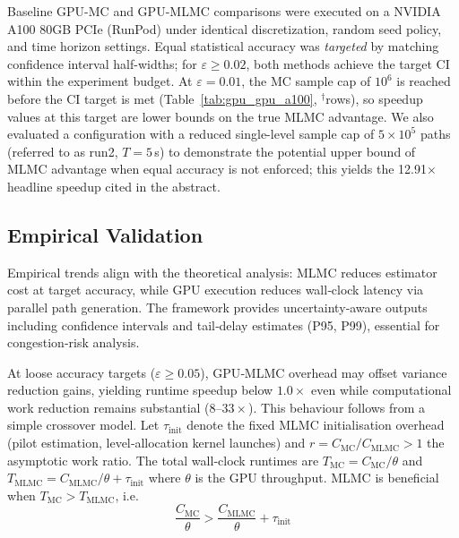 \documentclass{ieeeaccess}
\begin{document}
Baseline GPU-MC and GPU-MLMC comparisons were executed on a NVIDIA A100 80GB PCIe (RunPod)
under identical discretization, random seed policy, and time horizon settings. Equal statistical
accuracy was \emph{targeted} by matching confidence interval half-widths; for $\varepsilon \geq
0.02$, both methods achieve the target CI within the experiment budget. At $\varepsilon=0.01$,
the MC sample cap of $10^6$ is reached before the CI target is met
(Table~\ref{tab:gpu_gpu_a100}, $^\dagger$rows), so speedup values at this target are lower bounds
on the true MLMC advantage. We also evaluated a configuration with a reduced single-level
sample cap of $5\times10^5$ paths (referred to as run2, $T{=}5$\,s) to demonstrate the
potential upper bound of MLMC advantage when equal accuracy is not enforced; this yields
the 12.91$\times$ headline speedup cited in the abstract.

\subsection{Empirical Validation}
Empirical trends align with the theoretical analysis: MLMC reduces estimator cost at target accuracy, while GPU execution reduces wall‑clock latency via parallel path generation. The framework provides uncertainty‑aware outputs including confidence intervals and tail‑delay estimates (P95, P99), essential for congestion‑risk analysis.

At loose accuracy targets (\(\varepsilon \geq 0.05\)), GPU‑MLMC overhead may offset variance reduction gains, yielding runtime speedup below \(1.0\times\) even while computational work reduction remains substantial (\(8\)–\(33\times\)). This behaviour follows from a simple crossover model. Let \(\tau_{\text{init}}\) denote the fixed MLMC initialisation overhead (pilot estimation, level‑allocation kernel launches) and \(r = C_{\mathrm{MC}}/C_{\mathrm{MLMC}} > 1\) the asymptotic work ratio. The total wall‑clock runtimes are \(T_{\mathrm{MC}} = C_{\mathrm{MC}}/\theta\) and \(T_{\mathrm{MLMC}} = C_{\mathrm{MLMC}}/\theta + \tau_{\text{init}}\) where $\theta$ is the GPU throughput. MLMC is beneficial when \(T_{\mathrm{MC}} > T_{\mathrm{MLMC}}\), i.e.
\begin{equation}
    \frac{C_{\mathrm{MC}}}{\theta} > \frac{C_{\mathrm{MLMC}}}{\theta} + \tau_{\text{init}}
\end{equation}
\end{document}
